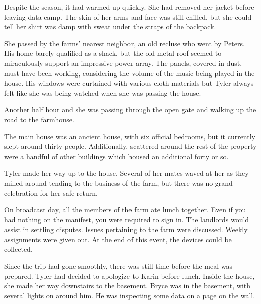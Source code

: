 Despite the season, it had warmed up quickly. She had removed her jacket before
leaving data camp. The skin of her arms and face was still chilled, but she could
tell her shirt was damp with sweat under the straps of the backpack.

She passed by the farms' nearest neighbor, an old recluse who went by Peters.
His home barely qualified as a shack, but the old metal roof seemed to miraculously
support an impressive power array. The panels, covered in dust, must have been
working, considering the volume of the music being played in the house. His windows
were curtained with various cloth materials but Tyler always felt like she was
being watched when she was passing the house.

Another half hour and she was passing through the open gate and walking up the road
to the farmhouse.

The main house was an ancient house, with six official bedrooms,
but it currently slept around thirty people. Additionally, scattered around the rest of the
property were a handful of other buildings which housed an additional forty or so.

Tyler made her way up to the house. Several of her mates waved at her as they
milled around tending to the business of the farm, but there was no grand celebration
for her safe return.

On broadcast day, all the members of the farm ate lunch together. Even if you
had nothing on the manifest, you were required to sign in. The landlords would
assist in settling disputes. Issues pertaining to the farm were discussed. Weekly
assignments were given out. At the end of this event, the devices could be collected.

Since the trip had gone smoothly, there was still time before the meal was prepared.
Tyler had decided to apologize to Karin before lunch. Inside the house, she made her
way downstairs to the basement. Bryce was in the basement, with several lights on
around him. He was inspecting some data on a page on the wall.
